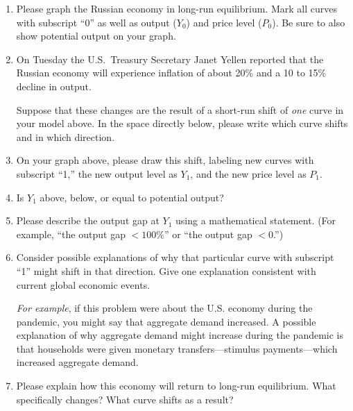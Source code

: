 \documentclass[
    letterpaper,paper=portrait,fleqn,
    DIV=16,fontsize=12pt,twoside=semi,
    parskip=full-,
    headings=standardclasses]
{scrartcl}
\begin{document}
\begin{enumerate}

\item Please graph the Russian economy in long-run equilibrium. Mark all curves with subscript ``0'' as well as output ($Y_0$) and price level ($P_0$). Be sure to also show potential output on your graph.

\vfill

\item On Tuesday the U.S.~Treasury Secretary Janet Yellen reported that the Russian economy will experience inflation of about 20\% and a 10 to 15\% decline in output.

Suppose that these changes are the result of a short-run shift of \emph{one} curve in your model above. In the space directly below, please write which curve shifts and in which direction.

\vspace{3.0\baselineskip}

\clearpage

\item On your graph above, please draw this shift, labeling new curves with subscript ``1,'' the new output level as $Y_1$, and the new price level as $P_1$.

\item Is $Y_1$ above, below, or equal to potential output?

\vspace{3.0\baselineskip}

\item Please describe the output gap at $Y_1$ using a mathematical statement. (For example, ``the output gap $<100\%$'' or ``the output gap $<0$.'')

\vspace{4.0\baselineskip}

\item Consider possible explanations of why that particular curve with subscript ``1'' might shift in that direction. Give one explanation consistent with current global economic events.

\emph{For example}, if this problem were about the U.S. economy during the pandemic, you might say that aggregate demand increased. A possible explanation of why aggregate demand might increase during the pandemic is that households were given monetary transfers---stimulus payments---which increased aggregate demand.

\vfill

\item Please explain how this economy will return to long-run equilibrium. What specifically changes? What curve shifts as a result?


\end{enumerate}
\end{document}
